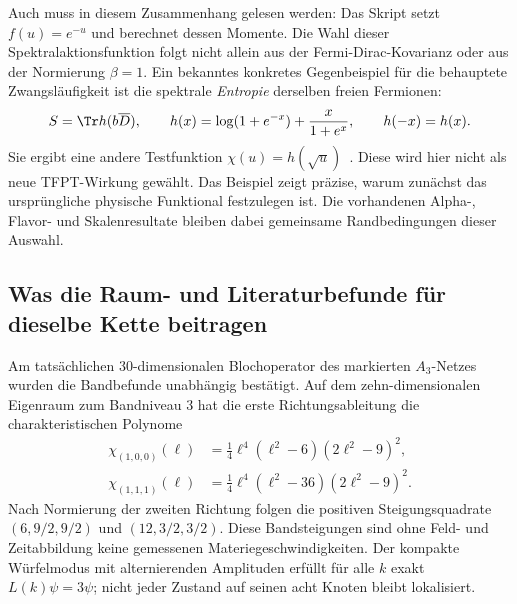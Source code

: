 Auch  muss in diesem
Zusammenhang gelesen werden: Das Skript setzt $f(u)=e^{-u}$ und berechnet
dessen Momente. Die Wahl dieser Spektralaktionsfunktion folgt nicht allein
aus der Fermi-Dirac-Kovarianz oder aus der Normierung $\beta=1$.
Ein bekanntes konkretes Gegenbeispiel für die behauptete Zwangsläufigkeit
ist die spektrale \emph{Entropie} derselben freien Fermionen:
\begin{equation}
S=\Tr h(b\overline D),\qquad
h(x)=\log(1+e^{-x})+\frac{x}{1+e^x},\qquad h(-x)=h(x).
\end{equation}
Sie ergibt eine andere Testfunktion $\chi(u)=h(\sqrt u)$~\cite{entropyaction}.
Diese wird hier nicht als neue TFPT-Wirkung gewählt. Das Beispiel zeigt
präzise, warum zunächst das ursprüngliche physische Funktional festzulegen
ist. Die vorhandenen Alpha-, Flavor- und Skalenresultate bleiben dabei
gemeinsame Randbedingungen dieser Auswahl.


\subsection{Was die Raum- und Literaturbefunde für dieselbe Kette beitragen}
Am tatsächlichen 30-dimensionalen Blochoperator des markierten $A_3$-Netzes wurden die Bandbefunde unabhängig bestätigt. Auf dem zehn-dimensionalen Eigenraum zum Bandniveau $3$ hat die erste Richtungsableitung die charakteristischen Polynome
\begin{align}
\chi_{(1,0,0)}(\ell)&=\tfrac14\ell^4(\ell^2-6)(2\ell^2-9)^2,\\
\chi_{(1,1,1)}(\ell)&=\tfrac14\ell^4(\ell^2-36)(2\ell^2-9)^2.
\end{align}
Nach Normierung der zweiten Richtung folgen die positiven Steigungsquadrate $(6,9/2,9/2)$ und $(12,3/2,3/2)$. Diese Bandsteigungen sind ohne Feld- und Zeitabbildung keine gemessenen Materiegeschwindigkeiten. Der kompakte Würfelmodus mit alternierenden Amplituden erfüllt für alle $k$ exakt $L(k)\psi=3\psi$; nicht jeder Zustand auf seinen acht Knoten bleibt lokalisiert.

